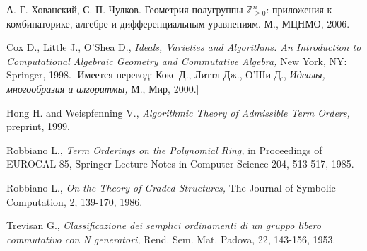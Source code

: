 \documentclass[a4paper,reqno,12pt]{amsart}
\theoremstyle{plain}
\theoremstyle{remark}
\theoremstyle{definition}
\renewcommand{\ge}{\geqslant}
\newcommand{\Z}{\mathbb{Z}}
\newcommand{\Zplusn}{\Z_{\ge 0}^n}
\begin{document}
\begin{thebibliography}{99}
 А. Г. Хованский, С. П. Чулков.
Геометрия полугруппы $\Zplusn$: приложения к комбинаторике, алгебре и дифференциальным уравнениям.
М., МЦНМО, 2006.

 Cox D., Little J., O'Shea D.,
 {\it Ideals, Varieties and Algorithms.
  An Introduction to Computational Algebraic Geometry and Commutative Algebra,}
 New York, NY: Springer, 1998.
  [Имеется перевод: Кокс Д., Литтл Дж., О'Ши Д.,
   {\it Идеалы, многообразия и алгоритмы,}
    М., Мир, 2000.]

 Hong H. and Weispfenning V.,
 {\it Algorithmic Theory of Admissible Term Orders,}
 preprint, 1999.

 Robbiano L.,
 {\it Term Orderings on the Polynomial Ring,}
 in Proceedings of EUROCAL 85,
 Springer Lecture Notes in Computer Science 204, 513-517, 1985.

 Robbiano L.,
 {\it On the Theory of Graded Structures,}
 The Journal of Symbolic Computation, 2, 139-170, 1986.

 Trevisan G.,
 {\it Classificazione dei semplici ordinamenti di
  un gruppo libero commutativo con N generatori,}
 Rend. Sem. Mat. Padova, 22, 143-156, 1953.

\end{thebibliography}
\end{document}
